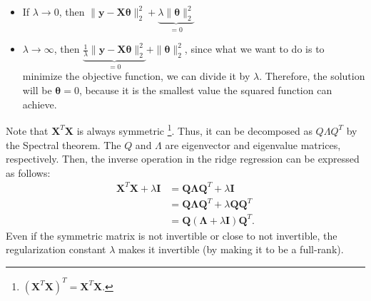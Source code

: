 \begin{itemize}
	\item If $\lambda\to 0$, then $\|\mathbf{y}-\mathbf{X}\boldsymbol{\theta}\|^2_2 + \underbrace{\lambda \|\boldsymbol{\theta}\|^2_2}_{=0}$ 
	\item $\lambda\to \infty$, then $\underbrace{\frac{1}{\lambda}\|\mathbf{y}-\mathbf{X}\boldsymbol{\theta}\|^2_2}_{=0} + \|\boldsymbol{\theta}\|^2_2$, since what we want to do is to minimize the objective function, we can divide it by $\lambda$. Therefore, the solution will be $\boldsymbol{\theta}=0$, because it is the smallest value the squared function can achieve. 
\end{itemize}
Note that $\mathbf{X}^T\mathbf{X}$ is always symmetric \footnote{$(\mathbf{X}^T\mathbf{X})^T = \mathbf{X}^T\mathbf{X}$.}. Thus, it can be decomposed as $Q\Lambda Q^T$ by the Spectral theorem. The $Q$ and $\Lambda$ are eigenvector and eigenvalue matrices, respectively. Then, the inverse operation in the ridge regression can be expressed as follows:
\begin{align*}
	\mathbf{X}^T\mathbf{X}+\lambda\mathbf{I} &= \mathbf{Q}\mathbf{\Lambda}\mathbf{Q}^T+\lambda\mathbf{I}\\
											 &= \mathbf{Q}\mathbf{\Lambda}\mathbf{Q}^T+\lambda\mathbf{Q}\mathbf{Q}^T\\
											 &= \mathbf{Q}(\mathbf{\Lambda}+\lambda\mathbf{I})\mathbf{Q}^T.
\end{align*}
Even if the symmetric matrix is not invertible or close to not invertible, the regularization constant $\lambda$ makes it invertible (by making it to be a full-rank). 


